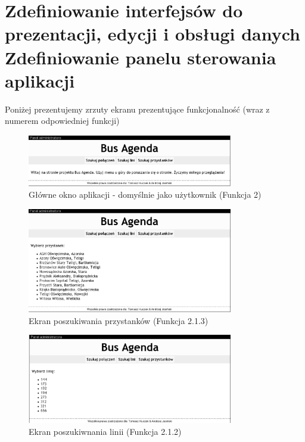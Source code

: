 \section{Zdefiniowanie interfejsów do prezentacji, edycji i obsługi danych\\
Zdefiniowanie panelu sterowania aplikacji}
Poniżej prezentujemy zrzuty ekranu prezentujące funkcjonalność (wraz z numerem odpowiedniej funkcji)
\begin{figure}[!htp]
    \centering
    \includegraphics[width=0.8\textwidth]{./img/screens/mainScreen.eps}
    \caption{Główne okno aplikacji - domyślnie jako użytkownik (Funkcja 2)}
    \label{fig:main}
\end{figure}

\begin{figure}[!htp]
    \centering
    \includegraphics[width=0.8\textwidth]{./img/screens/BusStopsSearch.eps}
    \caption{Ekran poszukiwania przystanków (Funkcja 2.1.3)}
    \label{fig:searchBS}
\end{figure}

\begin{figure}[!htp]
    \centering
    \includegraphics[width=0.8\textwidth]{./img/screens/linesSearch.eps}
    \caption{Ekran poszukiwnania linii (Funkcja 2.1.2)}
    \label{fig:searchLine}
\end{figure}

